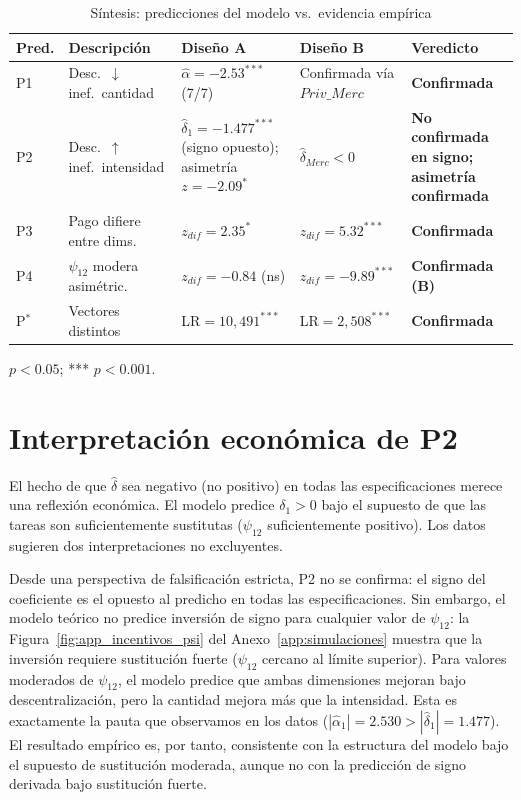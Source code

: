 \begin{table}[htbp]
\centering
\caption{Síntesis: predicciones del modelo vs.\ evidencia empírica}
\label{tab:sintesis}
\begin{threeparttable}
\small
\begin{tabular}{p{0.8cm}p{3.5cm}p{3cm}p{3cm}p{1.5cm}}
\toprule
\textbf{Pred.} & \textbf{Descripción} &
\textbf{Diseño A} & \textbf{Diseño B} &
\textbf{Veredicto} \\
\midrule
P1 & Desc.\ $\downarrow$ inef.\ cantidad
  & $\hat{\alpha}=-2.53^{***}$ (7/7)
  & Confirmada vía $Priv\_Merc$
  & \textbf{Confirmada} \\[6pt]
P2 & Desc.\ $\uparrow$ inef.\ intensidad
  & $\hat{\delta}_1 = -1.477^{***}$ (signo opuesto); asimetría $z = -2.09^{*}$
  & $\hat{\delta}_{Merc}<0$
  & \textbf{No confirmada en signo; asimetría confirmada} \\[6pt]
P3 & Pago difiere entre dims.
  & $z_{dif}=2.35^{*}$
  & $z_{dif}=5.32^{***}$
  & \textbf{Confirmada} \\[6pt]
P4 & $\psi_{12}$ modera asimétric.
  & $z_{dif}=-0.84$ (ns)
  & $z_{dif}=-9.89^{***}$
  & \textbf{Confirmada (B)} \\[6pt]
P$^*$ & Vectores distintos
  & LR$=10{,}491^{***}$
  & LR$=2{,}508^{***}$
  & \textbf{Confirmada} \\
\bottomrule
\end{tabular}
\begin{tablenotes}
  \small
  \item * $p<0.05$; *** $p<0.001$.
\end{tablenotes}
\end{threeparttable}
\end{table}

\section{Interpretación económica de P2}

El hecho de que $\hat{\delta}$ sea negativo (no positivo) en todas las especificaciones merece una reflexión económica. El modelo predice $\delta_1 > 0$ bajo el supuesto de que las tareas son suficientemente sustitutas ($\psi_{12}$ suficientemente positivo). Los datos sugieren dos interpretaciones no excluyentes.

Desde una perspectiva de falsificación estricta, P2 no se confirma: el signo del coeficiente es el opuesto al predicho en todas las especificaciones. Sin embargo, el modelo teórico no predice inversión de signo para cualquier valor de $\psi_{12}$: la Figura~\ref{fig:app_incentivos_psi} del Anexo~\ref{app:simulaciones} muestra que la inversión requiere sustitución fuerte ($\psi_{12}$ cercano al límite superior). Para valores moderados de $\psi_{12}$, el modelo predice que ambas dimensiones mejoran bajo descentralización, pero la cantidad mejora más que la intensidad. Esta es exactamente la pauta que observamos en los datos ($|\hat{\alpha}_1| = 2.530 > |\hat{\delta}_1| = 1.477$). El resultado empírico es, por tanto, consistente con la estructura del modelo bajo el supuesto de sustitución moderada, aunque no con la predicción de signo derivada bajo sustitución fuerte.

